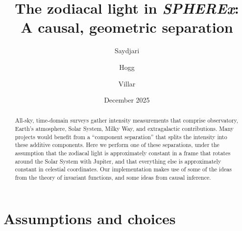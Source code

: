 \documentclass{article}
\title{\bfseries%
The zodiacal light in {\slshape SPHEREx}:\\ A causal, geometric separation}
\author{Saydjari \and Hogg \and Villar}
\date{December 2025}
\begin{document}
\maketitle

\begin{abstract}\noindent
    All-sky, time-domain surveys gather intensity measurements that comprise observatory, Earth's atmosphere, Solar System, Milky Way, and extragalactic contributions.
    Many projects would benefit from a ``component separation'' that splits the intensity into these additive components.
    Here we perform one of these separations, under the assumption that the zodiacal light is approximately constant in a frame that rotates around the Solar System with Jupiter, and that everything else is approximately constant in celestial coordinates.
    Our implementation makes use of some of the ideas from the theory of invariant functions, and some ideas from causal inference.
\end{abstract}

\section{Assumptions and choices}
\end{document}
